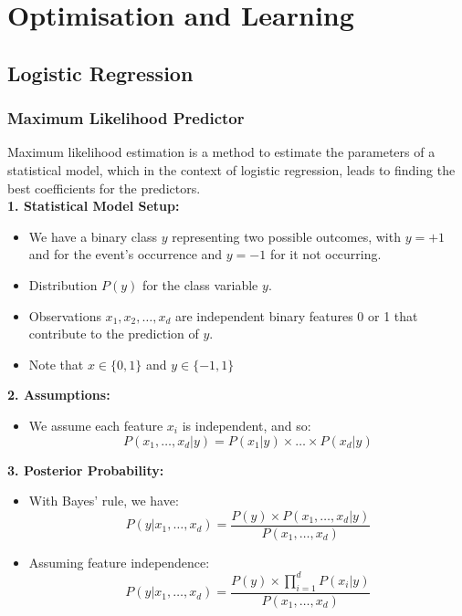 \chapter{Optimisation and Learning}
\section{Logistic Regression}
\subsection{Maximum Likelihood Predictor}
Maximum likelihood estimation is a method to estimate the parameters of a statistical model, which in the context of logistic regression, leads to finding the best coefficients for the predictors.\\

\textbf{1. Statistical Model Setup:}
\begin{itemize}
    \item We have a binary class \( y \) representing two possible outcomes, with \( y = +1 \) and for the event's occurrence and \(y=-1\) for it not occurring.
    \item Distribution \( P(y) \) for the class variable \( y \).
    \item Observations \( x_1, x_2, \ldots, x_d \) are independent binary features 0 or 1 that contribute to the prediction of $y$.
    \item Note that $x \in \{0,1\}$ and $y \in \{-1,1\}$
\end{itemize}

\textbf{2. Assumptions:}
\begin{itemize}
    \item We assume each feature $x_i$ is independent, and so:
    \[ P(x_1, \ldots, x_d|y) = P(x_1|y) \times \ldots \times P(x_d|y) \]
\end{itemize}

\textbf{3. Posterior Probability:}
\begin{itemize}
    \item With Bayes' rule, we have:
    \[ P(y|x_1, \ldots, x_d) = \frac{P(y) \times P(x_1, \ldots, x_d|y)}{P(x_1, \ldots, x_d)} \]
    \item Assuming feature independence:
    \[ P(y|x_1, \ldots, x_d) = \frac{P(y) \times \prod_{i=1}^{d} P(x_i|y)}{P(x_1, \ldots, x_d)} \]
\end{itemize}

